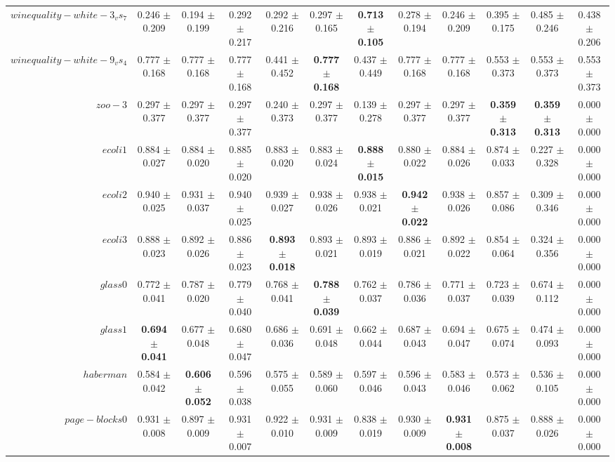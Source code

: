 \begin{table}[!ht]
{\begin{tabular}{r c c c c c c c c c c c}
$winequality-white-3_vs_7$ & 0.246 $\pm$ 0.209 & 0.194 $\pm$ 0.199 & 0.292 $\pm$ 0.217 & 0.292 $\pm$ 0.216 & 0.297 $\pm$ 0.165 & \textbf{0.713 $\pm$ 0.105} & 0.278 $\pm$ 0.194 & 0.246 $\pm$ 0.209 & 0.395 $\pm$ 0.175 & 0.485 $\pm$ 0.246 & 0.438 $\pm$ 0.206 \\
$winequality-white-9_vs_4$ & 0.777 $\pm$ 0.168 & 0.777 $\pm$ 0.168 & 0.777 $\pm$ 0.168 & 0.441 $\pm$ 0.452 & \textbf{0.777 $\pm$ 0.168} & 0.437 $\pm$ 0.449 & 0.777 $\pm$ 0.168 & 0.777 $\pm$ 0.168 & 0.553 $\pm$ 0.373 & 0.553 $\pm$ 0.373 & 0.553 $\pm$ 0.373 \\
$zoo-3$ & 0.297 $\pm$ 0.377 & 0.297 $\pm$ 0.377 & 0.297 $\pm$ 0.377 & 0.240 $\pm$ 0.373 & 0.297 $\pm$ 0.377 & 0.139 $\pm$ 0.278 & 0.297 $\pm$ 0.377 & 0.297 $\pm$ 0.377 & \textbf{0.359 $\pm$ 0.313} & \textbf{0.359 $\pm$ 0.313} & 0.000 $\pm$ 0.000 \\
$ecoli1$ & 0.884 $\pm$ 0.027 & 0.884 $\pm$ 0.020 & 0.885 $\pm$ 0.020 & 0.883 $\pm$ 0.020 & 0.883 $\pm$ 0.024 & \textbf{0.888 $\pm$ 0.015} & 0.880 $\pm$ 0.022 & 0.884 $\pm$ 0.026 & 0.874 $\pm$ 0.033 & 0.227 $\pm$ 0.328 & 0.000 $\pm$ 0.000 \\
$ecoli2$ & 0.940 $\pm$ 0.025 & 0.931 $\pm$ 0.037 & 0.940 $\pm$ 0.025 & 0.939 $\pm$ 0.027 & 0.938 $\pm$ 0.026 & 0.938 $\pm$ 0.021 & \textbf{0.942 $\pm$ 0.022} & 0.938 $\pm$ 0.026 & 0.857 $\pm$ 0.086 & 0.309 $\pm$ 0.346 & 0.000 $\pm$ 0.000 \\
$ecoli3$ & 0.888 $\pm$ 0.023 & 0.892 $\pm$ 0.026 & 0.886 $\pm$ 0.023 & \textbf{0.893 $\pm$ 0.018} & 0.893 $\pm$ 0.021 & 0.893 $\pm$ 0.019 & 0.886 $\pm$ 0.021 & 0.892 $\pm$ 0.022 & 0.854 $\pm$ 0.064 & 0.324 $\pm$ 0.356 & 0.000 $\pm$ 0.000 \\
$glass0$ & 0.772 $\pm$ 0.041 & 0.787 $\pm$ 0.020 & 0.779 $\pm$ 0.040 & 0.768 $\pm$ 0.041 & \textbf{0.788 $\pm$ 0.039} & 0.762 $\pm$ 0.037 & 0.786 $\pm$ 0.036 & 0.771 $\pm$ 0.037 & 0.723 $\pm$ 0.039 & 0.674 $\pm$ 0.112 & 0.000 $\pm$ 0.000 \\
$glass1$ & \textbf{0.694 $\pm$ 0.041} & 0.677 $\pm$ 0.048 & 0.680 $\pm$ 0.047 & 0.686 $\pm$ 0.036 & 0.691 $\pm$ 0.048 & 0.662 $\pm$ 0.044 & 0.687 $\pm$ 0.043 & 0.694 $\pm$ 0.047 & 0.675 $\pm$ 0.074 & 0.474 $\pm$ 0.093 & 0.000 $\pm$ 0.000 \\
$haberman$ & 0.584 $\pm$ 0.042 & \textbf{0.606 $\pm$ 0.052} & 0.596 $\pm$ 0.038 & 0.575 $\pm$ 0.055 & 0.589 $\pm$ 0.060 & 0.597 $\pm$ 0.046 & 0.596 $\pm$ 0.043 & 0.583 $\pm$ 0.046 & 0.573 $\pm$ 0.062 & 0.536 $\pm$ 0.105 & 0.000 $\pm$ 0.000 \\
$page-blocks0$ & 0.931 $\pm$ 0.008 & 0.897 $\pm$ 0.009 & 0.931 $\pm$ 0.007 & 0.922 $\pm$ 0.010 & 0.931 $\pm$ 0.009 & 0.838 $\pm$ 0.019 & 0.930 $\pm$ 0.009 & \textbf{0.931 $\pm$ 0.008} & 0.875 $\pm$ 0.037 & 0.888 $\pm$ 0.026 & 0.000 $\pm$ 0.000 \\

\end{tabular}}
\end{table}
